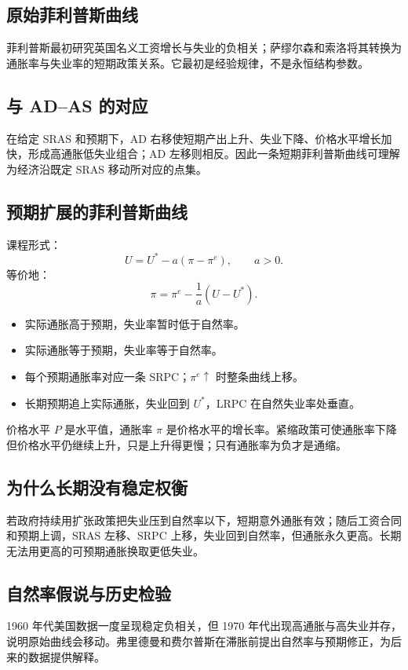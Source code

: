 \documentclass[UTF8,11pt,a4paper]{ctexart}
\begin{document}
\subsection{原始菲利普斯曲线}
菲利普斯最初研究英国名义工资增长与失业的负相关；萨缪尔森和索洛将其转换为通胀率与失业率的短期政策关系。它最初是经验规律，不是永恒结构参数。

\subsection{与 AD--AS 的对应}
在给定 SRAS 和预期下，AD 右移使短期产出上升、失业下降、价格水平增长加快，形成高通胀低失业组合；AD 左移则相反。因此一条短期菲利普斯曲线可理解为经济沿既定 SRAS 移动所对应的点集。

\subsection{预期扩展的菲利普斯曲线}
课程形式：
\[
U=U^*-a(\pi-\pi^e),\qquad a>0.
\]
等价地：
\[
\pi=\pi^e-\frac1a(U-U^*).
\]
\begin{itemize}
  \item 实际通胀高于预期，失业率暂时低于自然率。
  \item 实际通胀等于预期，失业率等于自然率。
  \item 每个预期通胀率对应一条 SRPC；$\pi^e\uparrow$ 时整条曲线上移。
  \item 长期预期追上实际通胀，失业回到 $U^*$，LRPC 在自然失业率处垂直。
\end{itemize}

\begin{warningbox}[价格水平和通胀率不是同一变量]
价格水平 $P$ 是水平值，通胀率 $\pi$ 是价格水平的增长率。紧缩政策可使通胀率下降但价格水平仍继续上升，只是上升得更慢；只有通胀率为负才是通缩。
\end{warningbox}

\subsection{为什么长期没有稳定权衡}
若政府持续用扩张政策把失业压到自然率以下，短期意外通胀有效；随后工资合同和预期上调，SRAS 左移、SRPC 上移，失业回到自然率，但通胀永久更高。长期无法用更高的可预期通胀换取更低失业。

\subsection{自然率假说与历史检验}
1960 年代美国数据一度呈现稳定负相关，但 1970 年代出现高通胀与高失业并存，说明原始曲线会移动。弗里德曼和费尔普斯在滞胀前提出自然率与预期修正，为后来的数据提供解释。
\end{document}
